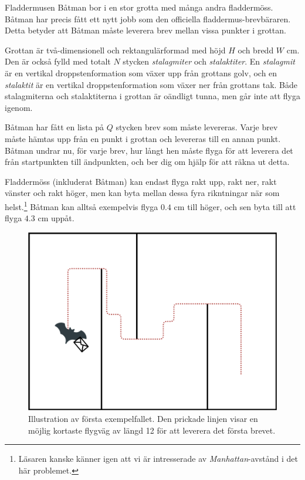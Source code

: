 
Fladdermusen Båtman bor i en stor grotta med många andra fladdermöss.
Båtman har precis fått ett nytt jobb som den officiella fladdermus-brevbäraren.
Detta betyder att Båtman måste leverera brev mellan vissa punkter i grottan.

Grottan är två-dimensionell och rektangulärformad med höjd $H$ och bredd $W$ cm.
Den är också fylld med totalt $N$ stycken \emph{stalagmiter} och
\emph{stalaktiter}. En \emph{stalagmit} är en vertikal droppstenformation som
växer upp från grottans golv, och en \emph{stalaktit} är en vertikal
droppstenformation som växer ner från grottans tak.
Både stalagmiterna och stalaktiterna i grottan är oändligt tunna, men går inte
att flyga igenom.

Båtman har fått en lista på $Q$ stycken brev som måste levereras.
Varje brev måste hämtas upp från en punkt i grottan och levereras till en
annan punkt. Båtman undrar nu, för varje brev, hur långt hen måste flyga
för att leverera det från startpunkten till ändpunkten, och ber dig om
hjälp för att räkna ut detta.

Fladdermöss (inkluderat Båtman) kan endast flyga rakt upp, rakt ner,
rakt vänster och rakt höger, men kan byta mellan dessa fyra rikntningar
när som helst.\footnote{Läsaren kanske känner igen att vi är intresserade av \emph{Manhattan}-avstånd i det här problemet.}
Båtman kan alltså exempelvis flyga $0.4$ cm till höger, och sen byta till att flyga
$4.3$ cm uppåt.

\begin{figure}[!h]
\begin{center}
  \includegraphics[width=12cm]{fladdermus.png}
\end{center}
  \caption{Illustration av första exempelfallet. Den prickade linjen visar
  en möjlig kortaste flygväg av längd 12 för att leverera det första brevet.}
\end{figure}

